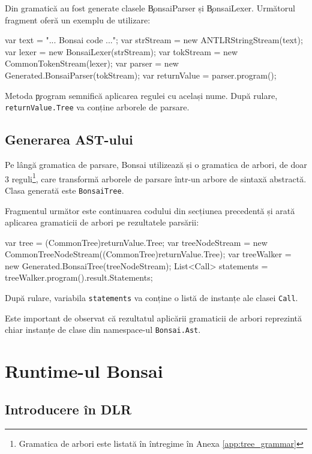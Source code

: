 \documentclass[12pt,a4paper]{memoir}
\begin{document}
Din gramatică au fost generate clasele \c{BonsaiParser} și \c{BonsaiLexer}. Următorul fragment oferă un exemplu de utilizare:

\begin{code}
var text = "... Bonsai code ...";
var strStream = new ANTLRStringStream(text);
var lexer = new BonsaiLexer(strStream);
var tokStream = new CommonTokenStream(lexer);
var parser = new Generated.BonsaiParser(tokStream);
var returnValue = parser.program();
\end{code}

Metoda \c{program} semnifică aplicarea regulei cu același nume. După rulare, \texttt{returnValue.Tree} va conține arborele de parsare.

\section{Generarea AST-ului}

Pe lângă gramatica de parsare, Bonsai utilizează și o gramatica de arbori, de doar 3 reguli\footnote{Gramatica de arbori este listată în întregime în Anexa \ref{app:tree_grammar}}, care transformă arborele de parsare într-un arbore de sintaxă abstractă. Clasa generată este \texttt{BonsaiTree}.

Fragmentul următor este continuarea codului din secțiunea precedentă și arată aplicarea gramaticii de arbori pe rezultatele parsării:

\begin{code}
var tree = (CommonTree)returnValue.Tree;
var treeNodeStream = 
    new CommonTreeNodeStream((CommonTree)returnValue.Tree);
var treeWalker = new Generated.BonsaiTree(treeNodeStream);
List<Call> statements = treeWalker.program().result.Statements;
\end{code}

După rulare, variabila \texttt{statements} va conține o listă de instanțe ale clasei \texttt{Call}.

Este important de observat că rezultatul aplicării gramaticii de arbori reprezintă chiar instanțe de clase din namespace-ul \texttt{Bonsai.Ast}.

\chapter{Runtime-ul Bonsai}

\section{Introducere în DLR}
\end{document}
